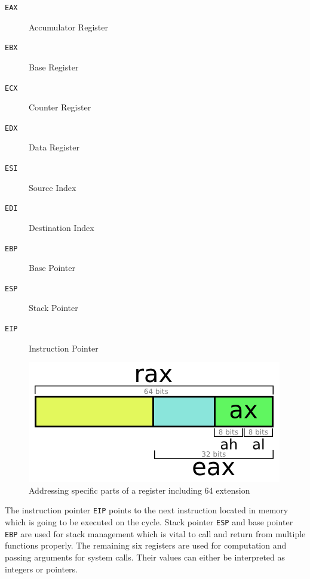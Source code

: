 \documentclass[article]{uibk}
\begin{document}
\begin{minipage}[t]{0.5\textwidth}
    \begin{description}
        \item[\texttt{EAX}] Accumulator Register
        \item[\texttt{EBX}] Base Register
        \item[\texttt{ECX}] Counter Register
        \item[\texttt{EDX}] Data Register
        \item[\texttt{ESI}] Source Index
        \item[\texttt{EDI}] Destination Index
        \item[\texttt{EBP}] Base Pointer
        \item[\texttt{ESP}] Stack Pointer
        \item[\texttt{EIP}] Instruction Pointer
    \end{description}
\end{minipage}
\begin{minipage}[t]{0.45\textwidth}
    \begin{figure}[H]
        \includegraphics[width=\textwidth]{gfx/single_register.png}
        \caption{Addressing specific parts of a register including \SI{64}{\bit} extension}
        \label{fig:single_register}
    \end{figure}
\end{minipage}
\bigskip

The instruction pointer \texttt{EIP} points to the next instruction located in
memory which is going to be executed on the cycle. Stack pointer \texttt{ESP} and base
pointer \texttt{EBP} are used for stack management which is vital to call and
return from multiple functions properly. The remaining six registers are used
for computation and passing arguments for system calls. Their values can either
be interpreted as integers or pointers.
\end{document}
